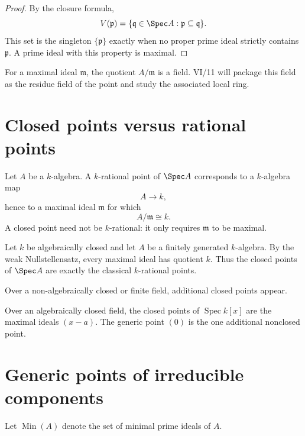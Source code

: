 \begin{proof}
By the closure formula,
\[
V(\mathfrak p)
=
\{\mathfrak q\in\Spec A:\mathfrak p\subseteq\mathfrak q\}.
\]
This set is the singleton $\{\mathfrak p\}$ exactly when no proper prime ideal strictly
contains $\mathfrak p$.  A prime ideal with this property is maximal.
\end{proof}

For a maximal ideal $\mathfrak m$, the quotient $A/\mathfrak m$ is a field.  VI/11 will
package this field as the residue field of the point and study the associated local ring.

\section{Closed points versus rational points}

Let $A$ be a $k$-algebra.  A $k$-rational point of $\Spec A$ corresponds to a $k$-algebra
map
\[
A\longrightarrow k,
\]
hence to a maximal ideal $\mathfrak m$ for which
\[
A/\mathfrak m\cong k.
\]
A closed point need not be $k$-rational: it only requires $\mathfrak m$ to be maximal.

\begin{theorem}
Let $k$ be algebraically closed and let $A$ be a finitely generated $k$-algebra.  By the
weak Nullstellensatz, every maximal ideal has quotient $k$.  Thus the closed points of
$\Spec A$ are exactly the classical $k$-rational points.
\end{theorem}

Over a non-algebraically closed or finite field, additional closed points appear.



\begin{example}\label{ex:vi09-expand-02}
Over an algebraically closed field, the closed points of $\operatorname{Spec}k[x]$ are the maximal ideals $(x-a)$.  The generic point $(0)$ is the one additional nonclosed point.
\end{example}
\section{Generic points of irreducible components}

Let $\operatorname{Min}(A)$ denote the set of minimal prime ideals of $A$.

